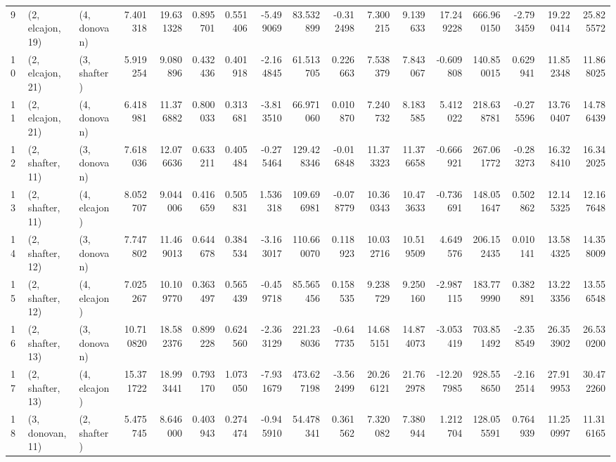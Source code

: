 \begin{tabular}{lllrrrrrrrrrrrrrr}
9  &  (2, elcajon, 19) &     (4, donovan) &   7.401318 &  19.631328 &   0.895701 &  0.551406 &  -5.499069 &   83.532899 & -0.312498 &   7.300215 &   9.139633 &  17.249228 &   666.960150 & -2.793459 &  19.220414 &  25.825572 \\
10 &  (2, elcajon, 21) &     (3, shafter) &   5.919254 &   9.080896 &   0.432436 &  0.401918 &  -2.164845 &   61.513705 &  0.226663 &   7.538379 &   7.843067 &  -0.609808 &   140.850015 &  0.629941 &  11.852348 &  11.868025 \\
11 &  (2, elcajon, 21) &     (4, donovan) &   6.418981 &  11.376882 &   0.800033 &  0.313681 &  -3.813510 &   66.971060 &  0.010870 &   7.240732 &   8.183585 &   5.412022 &   218.638781 & -0.275596 &  13.760407 &  14.786439 \\
12 &  (2, shafter, 11) &     (3, donovan) &   7.618036 &  12.076636 &   0.633211 &  0.405484 &  -0.275464 &  129.428346 & -0.016848 &  11.373323 &  11.376658 &  -0.666921 &   267.061772 & -0.283273 &  16.328410 &  16.342025 \\
13 &  (2, shafter, 11) &     (4, elcajon) &   8.052707 &   9.044006 &   0.416659 &  0.505831 &   1.536318 &  109.696981 & -0.078779 &  10.360343 &  10.473633 &  -0.736691 &   148.051647 &  0.502862 &  12.145325 &  12.167648 \\
14 &  (2, shafter, 12) &     (3, donovan) &   7.747802 &  11.469013 &   0.644678 &  0.384534 &  -3.163017 &  110.660070 &  0.118923 &  10.032716 &  10.519509 &   4.649576 &   206.152435 &  0.010141 &  13.584325 &  14.358009 \\
15 &  (2, shafter, 12) &     (4, elcajon) &   7.025267 &  10.109770 &   0.363497 &  0.565439 &  -0.459718 &   85.565456 &  0.158535 &   9.238729 &   9.250160 &  -2.987115 &   183.779990 &  0.382891 &  13.223356 &  13.556548 \\
16 &  (2, shafter, 13) &     (3, donovan) &  10.710820 &  18.582376 &   0.899228 &  0.624560 &  -2.363129 &  221.238036 & -0.647735 &  14.685151 &  14.874073 &  -3.053419 &   703.851492 & -2.358549 &  26.353902 &  26.530200 \\
17 &  (2, shafter, 13) &     (4, elcajon) &  15.371722 &  18.993441 &   0.793170 &  1.073050 &  -7.931679 &  473.627198 & -3.562499 &  20.266121 &  21.762978 & -12.207985 &   928.558650 & -2.162514 &  27.919953 &  30.472260 \\
18 &  (3, donovan, 11) &     (2, shafter) &   5.475745 &   8.646000 &   0.403943 &  0.274474 &  -0.945910 &   54.478341 &  0.361562 &   7.320082 &   7.380944 &   1.212704 &   128.055591 &  0.764939 &  11.250997 &  11.316165 \\

\end{tabular}
